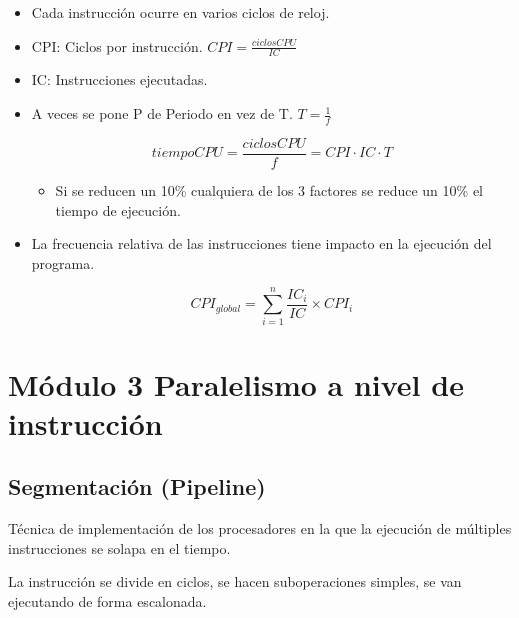 \documentclass[12pt, twoside, openright]{report} %
\begin{document}
\begin{itemize}

	\item Cada instrucción ocurre en varios ciclos de reloj.
	\item CPI: Ciclos por instrucción. \(CPI = \frac {ciclosCPU} {IC}\)
	\item IC: Instrucciones ejecutadas.
	\item A veces se pone P de Periodo en vez de T. $T=\frac 1f$

	      $$tiempoCPU = \frac {ciclosCPU} f= CPI\cdot IC\cdot T$$



	      \begin{itemize}

		      \item Si se reducen un 10\% cualquiera de los 3 factores se reduce un
		            10\% el tiempo de ejecución.
	      \end{itemize}
	\item La frecuencia relativa de las instrucciones tiene impacto en la
	      ejecución del programa.




	      $$CPI_{global}=\sum_{i=1}^{n} \frac {IC_i} {IC} \times CPI_i$$

\end{itemize}

\chapter{Módulo 3 Paralelismo a nivel de instrucción}



\section{Segmentación (Pipeline)}

Técnica de implementación de los procesadores en la que la ejecución
de múltiples instrucciones se solapa en el tiempo.

La instrucción se divide en ciclos, se hacen suboperaciones simples,
se van ejecutando de forma escalonada.
\end{document}
